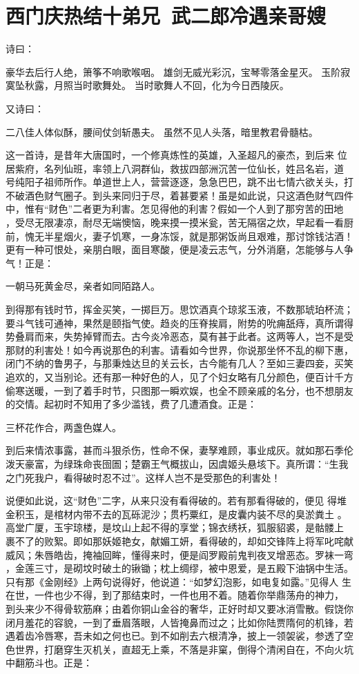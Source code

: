 \chapter{西门庆热结十弟兄~武二郎冷遇亲哥嫂}

诗曰：

豪华去后行人绝，箫筝不响歌喉咽。
雄剑无威光彩沉，宝琴零落金星灭。
玉阶寂寞坠秋露，月照当时歌舞处。
当时歌舞人不回，化为今日西陵灰。

又诗曰：

二八佳人体似酥，腰间仗剑斩愚夫。
虽然不见人头落，暗里教君骨髓枯。

这一首诗，是昔年大唐国时，一个修真炼性的英雄，入圣超凡的豪杰，到后来
位居紫府，名列仙班，率领上八洞群仙，救拔四部洲沉苦一位仙长，姓吕名岩，道
号纯阳子祖师所作。单道世上人，营营逐逐，急急巴巴，跳不出七情六欲关头，打
不破酒色财气圈子。到头来同归于尽，着甚要紧！虽是如此说，只这酒色财气四件
中，惟有“财色”二者更为利害。怎见得他的利害？假如一个人到了那穷苦的田地
，受尽无限凄凉，耐尽无端懊恼，晚来摸一摸米瓮，苦无隔宿之炊，早起看一看厨
前，愧无半星烟火，妻子饥寒，一身冻馁，就是那粥饭尚且艰难，那讨馀钱沽酒！
更有一种可恨处，亲朋白眼，面目寒酸，便是凌云志气，分外消磨，怎能够与人争
气！正是：

一朝马死黄金尽，亲者如同陌路人。

到得那有钱时节，挥金买笑，一掷巨万。思饮酒真个琼浆玉液，不数那琥珀杯流；
要斗气钱可通神，果然是颐指气使。趋炎的压脊挨肩，附势的吮痈舐痔，真所谓得
势叠肩而来，失势掉臂而去。古今炎冷恶态，莫有甚于此者。这两等人，岂不是受
那财的利害处！如今再说那色的利害。请看如今世界，你说那坐怀不乱的柳下惠，
闭门不纳的鲁男子，与那秉烛达旦的关云长，古今能有几人？至如三妻四妾，买笑
追欢的，又当别论。还有那一种好色的人，见了个妇女略有几分颜色，便百计千方
偷寒送暖，一到了着手时节，只图那一瞬欢娱，也全不顾亲戚的名分，也不想朋友
的交情。起初时不知用了多少滥钱，费了几遭酒食。正是：

三杯花作合，两盏色媒人。

到后来情浓事露，甚而斗狠杀伤，性命不保，妻孥难顾，事业成灰。就如那石季伦
泼天豪富，为绿珠命丧囹圄；楚霸王气概拔山，因虞姬头悬垓下。真所谓：“生我
之门死我户，看得破时忍不过”。这样人岂不是受那色的利害处！

说便如此说，这“财色”二字，从来只没有看得破的。若有那看得破的，便见
得堆金积玉，是棺材内带不去的瓦砾泥沙；贯朽粟红，是皮囊内装不尽的臭淤粪土
。高堂广厦，玉宇琼楼，是坟山上起不得的享堂；锦衣绣袄，狐服貂裘，是骷髅上
裹不了的败絮。即如那妖姬艳女，献媚工妍，看得破的，却如交锋阵上将军叱咤献
威风；朱唇皓齿，掩袖回眸，懂得来时，便是阎罗殿前鬼判夜叉增恶态。罗袜一弯
，金莲三寸，是砌坟时破土的锹锄；枕上绸缪，被中恩爱，是五殿下油锅中生活。
只有那《金刚经》上两句说得好，他说道：“如梦幻泡影，如电复如露。”见得人
生在世，一件也少不得，到了那结束时，一件也用不着。随着你举鼎荡舟的神力，
到头来少不得骨软筋麻；由着你铜山金谷的奢华，正好时却又要冰消雪散。假饶你
闭月羞花的容貌，一到了垂眉落眼，人皆掩鼻而过之；比如你陆贾隋何的机锋，若
遇着齿冷唇寒，吾未如之何也已。到不如削去六根清净，披上一领袈裟，参透了空
色世界，打磨穿生灭机关，直超无上乘，不落是非窠，倒得个清闲自在，不向火坑
中翻筋斗也。正是：

